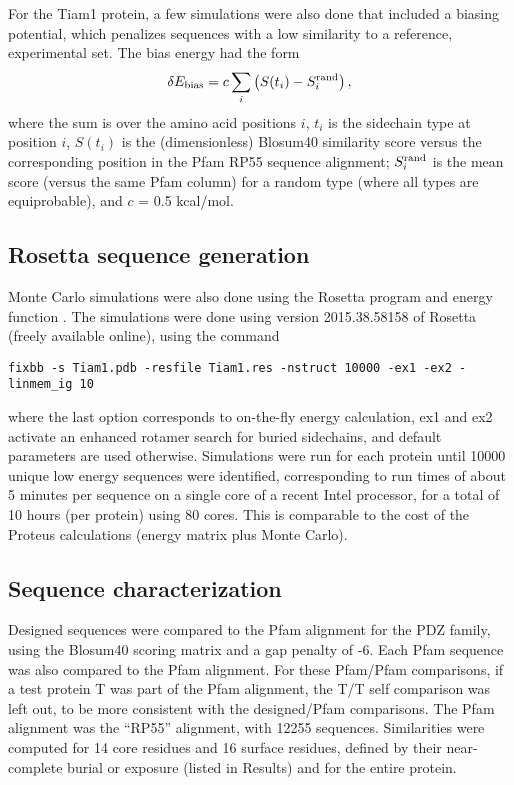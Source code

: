 \documentclass[12pt]{article}
\begin{document}
For the Tiam1 protein, a few simulations were also done that included a biasing potential, which penalizes sequences with
a low similarity to a reference, experimental set. The bias energy had the form
\begin{equation} \label{eq:bias}
\delta E_{\rm bias} = c \sum_i \left( S(t_i) - S_i^{\rm rand} \right),
\end{equation}
where the sum is over the amino acid positions $i$, $t_i$ is the sidechain type at position $i$, $S(t_i)$ is the (dimensionless)
Blosum40 similarity score versus the corresponding position in the Pfam RP55 sequence alignment; $S_i^{\rm rand}$ is the mean score
(versus the same Pfam column) for a random type (where all types are equiprobable), and $c$ = 0.5 kcal/mol.

\subsection{Rosetta sequence generation}
Monte Carlo simulations were also done using the Rosetta program and energy function \cite{Baker06b}. The simulations
were done using version 2015.38.58158 of Rosetta (freely available online), using the command \small
\begin{verbatim}
fixbb -s Tiam1.pdb -resfile Tiam1.res -nstruct 10000 -ex1 -ex2 -linmem_ig 10
\end{verbatim} \normalsize
where the last option corresponds to on-the-fly energy calculation, ex1 and ex2 activate an enhanced rotamer search for buried
sidechains, and default parameters are used otherwise. Simulations were run for each protein until 10000 unique low energy
sequences were identified, corresponding to run times of about 5 minutes per sequence on a single core of a recent Intel processor,
for a total of 10 hours (per protein) using 80 cores. This is comparable to the cost of the Proteus calculations (energy matrix
plus Monte Carlo).

\subsection{Sequence characterization}
Designed sequences were compared to the Pfam alignment for the PDZ family, using the Blosum40 scoring matrix and a
gap penalty of -6. Each Pfam sequence was also compared to the Pfam alignment. For these Pfam/Pfam comparisons, if a
test protein T was part of the Pfam alignment, the T/T self comparison was left out, to be more consistent with the
designed/Pfam comparisons. The Pfam alignment was the ``RP55'' alignment, with 12255 sequences. Similarities were
computed for 14 core residues and 16 surface residues, defined by their near-complete burial or exposure (listed in 
Results) and for the entire protein.
\end{document}
